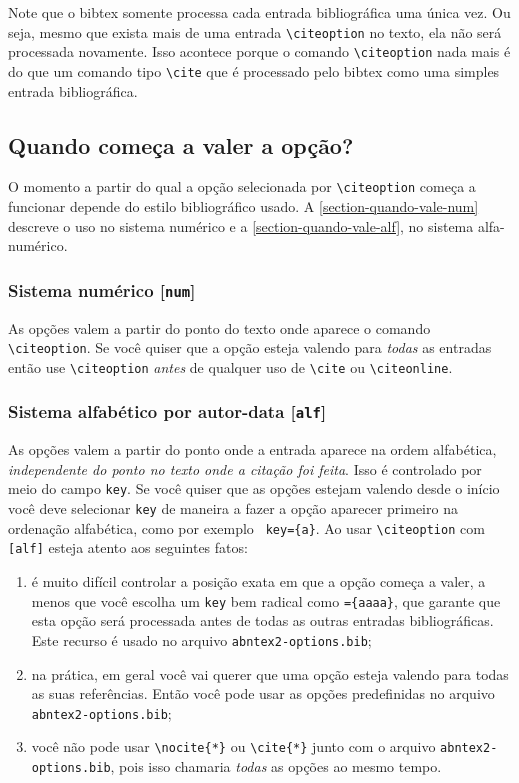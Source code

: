 \documentclass[a4paper]{ltxdoc}
\begin{document}
Note que o \textsf{bibtex} somente processa cada entrada bibliográfica uma única
vez. Ou seja, mesmo que exista mais de uma entrada \verb+\citeoption+ no texto,
ela não será processada novamente. Isso acontece porque o comando
\verb+\citeoption+ nada mais é do que um comando tipo \verb+\cite+ que é
processado pelo \textsf{bibtex} como uma simples entrada bibliográfica.

\subsection{Quando começa a valer a opção?}
\label{section-quando-vale}

O momento a partir do qual a opção selecionada por \verb+\citeoption+
começa a funcionar depende do estilo bibliográfico usado. A
\autoref{section-quando-vale-num} descreve o uso no sistema numérico e a
\autoref{section-quando-vale-alf}, no sistema alfa-numérico.

\subsubsection{Sistema numérico [\texttt{num}]}\label{section-quando-vale-num}

As opções valem a partir do ponto do texto onde aparece o comando
\verb+\citeoption+. Se você quiser que a opção esteja valendo para \emph{todas}
as entradas então use \verb+\citeoption+ \emph{antes} de qualquer uso de
\verb+\cite+ ou \verb+\citeonline+.

\subsubsection{Sistema alfabético por autor-data [\texttt{alf}]}
\label{section-quando-vale-alf}

As opções valem a partir do ponto onde a entrada aparece na ordem alfabética,
\emph{independente do ponto no texto onde a citação foi feita}. Isso é
controlado por meio do campo \texttt{key}. Se você quiser que as opções estejam
valendo desde o início você deve selecionar \texttt{key} de maneira a fazer a
opção aparecer primeiro na ordenação alfabética, como por exemplo \texttt{
key=\{a\}}. Ao usar \verb+\citeoption+ com \texttt{[alf]} esteja atento aos
seguintes fatos:

\begin{enumerate}
\item é muito difícil controlar a posição exata em que a opção
      começa a valer, a menos que você escolha um \texttt{key} bem
      radical como \texttt{=\{aaaa\}}, que garante que esta opção será
      processada antes de todas as outras entradas bibliográficas.
      Este recurso é usado no arquivo \texttt{abntex2-options.bib};
\item na prática, em geral você vai querer que uma opção esteja
      valendo para todas as suas referências. Então você pode usar
      as opções predefinidas no arquivo \texttt{abntex2-options.bib};
\item você não pode usar \verb+\nocite{*}+ ou \verb+\cite{*}+
      junto com o arquivo
      \texttt{abntex2-options.bib}, pois isso chamaria \emph{todas} as
      opções ao mesmo tempo.
\end{enumerate}
\end{document}
